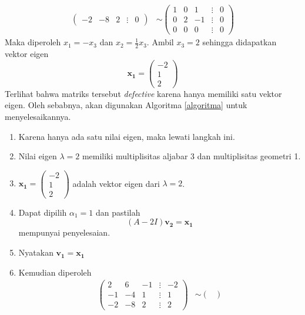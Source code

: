\documentclass[a4paper]{article}
\theoremstyle{definisi}
\numberwithin{equation}{section}
\begin{document}
\begin{enumerate}
\begin{enumerate}
\begin{align*}
\begin{pmatrix}
          -2&-8&2&\vdots&0
        \end{pmatrix}&\sim
        \begin{pmatrix}
          1&0&1&\vdots&0\\
          0&2&-1&\vdots&0\\
          0&0&0&\vdots&0
        \end{pmatrix}
      \end{align*}
      Maka diperoleh $x_1=-x_3$ dan $x_2=\frac{1}{2}x_3$. Ambil $x_3=2$ sehingga didapatkan vektor eigen
      \begin{equation*}
        \mathbf{x_1}=\begin{pmatrix}
          -2\\1\\2
        \end{pmatrix}
      \end{equation*}
      Terlihat bahwa matriks tersebut \textit{defective} karena hanya memiliki satu vektor eigen. Oleh sebabnya, akan digunakan Algoritma \ref{algoritma} untuk menyelesaikannya.
      \begin{enumerate}[label=Langkah \arabic*: ,leftmargin=*]
        \item Karena hanya ada satu nilai eigen, maka lewati langkah ini.
        \item Nilai eigen $\lambda=2$ memiliki multiplisitas aljabar 3 dan multiplisitas geometri 1.
        \item $\mathbf{x_1}=\begin{pmatrix}
          -2\\1\\2
        \end{pmatrix}$ adalah vektor eigen dari $\lambda=2$.
        \item Dapat dipilih $\alpha_1=1$ dan pastilah
        \begin{equation*}
          (A-2I)\mathbf{v_2}=\mathbf{x_1}
        \end{equation*}
        mempunyai penyelesaian.
        \item Nyatakan $\mathbf{v_1}=\mathbf{x_1}$
        \item Kemudian diperoleh
        \begin{align*}
          \begin{pmatrix}
            2&6&-1&\vdots&-2\\
            -1&-4&1&\vdots&1\\
            -2&-8&2&\vdots&2
          \end{pmatrix}&\sim
          \begin{pmatrix}

\end{pmatrix}
\end{align*}
\end{enumerate}
\end{enumerate}
\end{enumerate}
\end{document}
